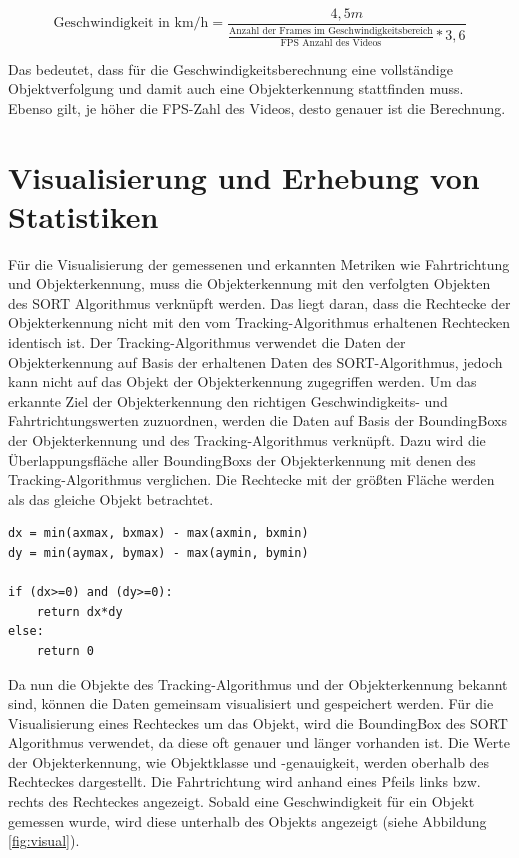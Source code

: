 \begin{equation}
	\text{Geschwindigkeit in km/h} = \frac{4,5m}{\frac{\text{Anzahl der Frames im Geschwindigkeitsbereich}}{\text{FPS Anzahl des Videos}} * 3,6} 
\end{equation}

Das bedeutet, dass für die Geschwindigkeitsberechnung eine vollständige Objektverfolgung und damit auch eine Objekterkennung stattfinden muss. Ebenso gilt, je höher die FPS-Zahl des Videos, desto genauer ist die Berechnung.

\section{Visualisierung und Erhebung von Statistiken}

Für die Visualisierung der gemessenen und erkannten Metriken wie Fahrtrichtung und Objekterkennung, muss die Objekterkennung mit den verfolgten Objekten des \ac{SORT} Algorithmus verknüpft werden. Das liegt daran, dass die Rechtecke der Objekterkennung nicht mit den vom Tracking-Algorithmus erhaltenen Rechtecken identisch ist. Der Tracking-Algorithmus verwendet die Daten der Objekterkennung auf Basis der erhaltenen Daten des SORT-Algorithmus, jedoch kann nicht auf das Objekt der Objekterkennung zugegriffen werden. Um das erkannte Ziel der Objekterkennung den richtigen Geschwindigkeits- und Fahrtrichtungswerten zuzuordnen, werden die Daten auf Basis der \glspl{BoundingBox} der Objekterkennung und des Tracking-Algorithmus verknüpft. Dazu wird die Überlappungsfläche aller \glspl{BoundingBox} der Objekterkennung mit denen des Tracking-Algorithmus verglichen. Die Rechtecke mit der größten Fläche werden als das gleiche Objekt betrachtet.

\vspace*{5mm}
\begin{lstlisting}[caption={Berechnung der Fläche zweier Rechtecke a und b}, label={lst:computation_of_area}]
dx = min(axmax, bxmax) - max(axmin, bxmin)
dy = min(aymax, bymax) - max(aymin, bymin)

if (dx>=0) and (dy>=0):
    return dx*dy
else:
    return 0
\end{lstlisting}

Da nun die Objekte des Tracking-Algorithmus und der Objekterkennung bekannt sind, können die Daten gemeinsam visualisiert und gespeichert werden. Für die Visualisierung eines Rechteckes um das Objekt, wird die \gls{BoundingBox} des \ac{SORT} Algorithmus verwendet, da diese oft genauer und länger vorhanden ist. Die Werte der Objekterkennung, wie Objektklasse und -genauigkeit, werden oberhalb des Rechteckes dargestellt. Die Fahrtrichtung wird anhand eines Pfeils links bzw. rechts des Rechteckes angezeigt. Sobald eine Geschwindigkeit für ein Objekt gemessen wurde, wird diese unterhalb des Objekts angezeigt (siehe Abbildung \ref{fig:visual}).

